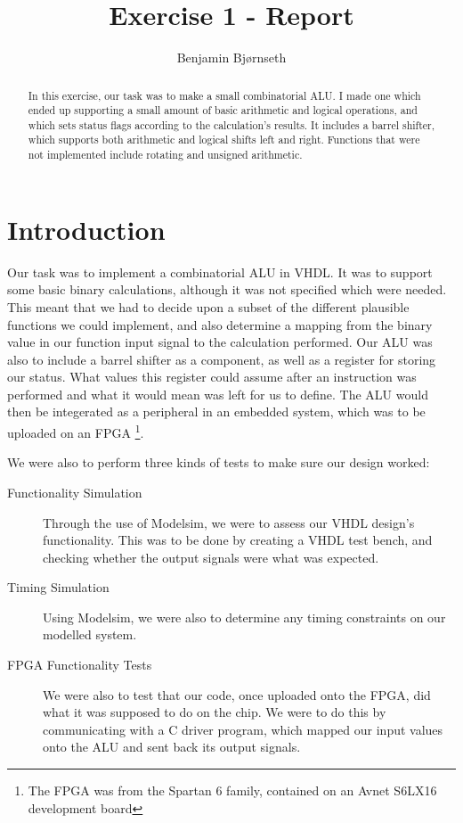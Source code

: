 \documentclass{article}
\title{Exercise 1 - Report}
\author{Benjamin Bj\o rnseth}
\begin{document}
\maketitle 
\begin{abstract}
In this exercise, our task was to make a small combinatorial ALU. I made one which ended up supporting a small amount of basic arithmetic and logical operations, and which sets status flags according to the calculation's results. It includes a barrel shifter, which supports both arithmetic and logical shifts left and right. Functions that were not implemented include rotating and unsigned arithmetic.
\end{abstract}

\section{Introduction}
\label{sec:introduction}
Our task was to implement a combinatorial ALU in VHDL. It was to support some basic binary calculations, although it was not specified which were needed. This meant that we had to decide upon a subset of the different plausible functions we could implement, and also determine a mapping from the binary value in our function input signal to the calculation performed. Our ALU was also to include a barrel shifter as a component, as well as a register for storing our status. What values this register could assume after an instruction was performed and what it would mean was left for us to define. The ALU would then be integerated as a peripheral in an embedded system, which was to be uploaded on an FPGA \footnote{The FPGA was from the Spartan 6 family, contained on an Avnet S6LX16 development board}. 

We were also to perform three kinds of tests to make sure our design worked:
\begin{description}
\item[Functionality Simulation] Through the use of Modelsim, we were to assess our VHDL design's functionality. This was to be done by creating a VHDL test bench, and checking whether the output signals were what was expected.
\item[Timing Simulation] Using Modelsim, we were also to determine any timing constraints on our modelled system.
\item[FPGA Functionality Tests] We were also to test that our code, once uploaded onto the FPGA, did what it was supposed to do on the chip. We were to do this by communicating with a C driver program, which mapped our input values onto the ALU and sent back its output signals.
\end{description}
\end{document}
